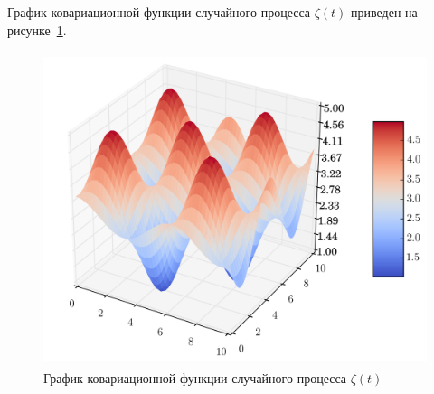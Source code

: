 График ковариационной функции случайного процесса $ \zeta(t) $ приведен на рисунке~\ref{pic:correlation}.
\begin{figure}[h]
  \centering
  \includegraphics[width=150mm, height=92mm]{pic/correlation}
  \caption{График ковариационной функции случайного процесса $ \zeta(t) $}
  \label{pic:correlation} 
\end{figure}
 
\newpage
